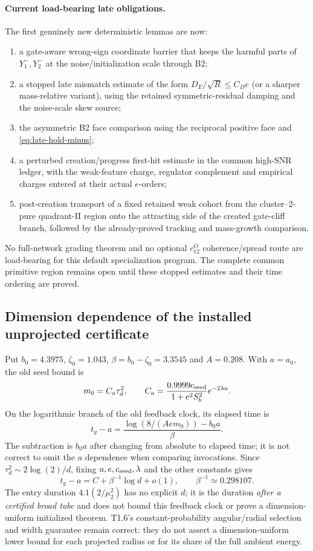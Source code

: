 \documentclass{article} %
\theoremstyle{plain}
\theoremstyle{definition}
\theoremstyle{remark}
\begin{document}
\paragraph{Current load-bearing late obligations.}
The first genuinely new deterministic lemmas are now:
\begin{enumerate}[label=\textnormal{(\roman*)}]
\item a gate-aware wrong-sign coordinate barrier that keeps the harmful parts
of $Y_1^-,Y_2^-$ at the noise/initialization scale through B2;
\item a stopped late mismatch estimate of the form $D_E/\sqrt R\le C_De$ (or
a sharper mass-relative variant), using the retained symmetric-residual
damping and the noise-scale skew source;
\item the asymmetric B2 face comparison using the reciprocal positive face and
\eqref{eq:late-hold-minus};
\item a perturbed creation/progress first-hit estimate in the common high-SNR
ledger, with the weak-feature charge, regulator complement and empirical
charges entered at their actual $e$-orders;
\item post-creation transport of a fixed retained weak cohort from the
cluster--2-pure quadrant-II region onto the attracting side of the created
gate-cliff branch, followed by the already-proved tracking and mass-growth
comparison.
\end{enumerate}
No full-network grading theorem and no optional $c_{12}^O$ coherence/spread
route are load-bearing for this default specialization program.  The complete
common primitive region remains open until these stopped estimates and their
time ordering are proved.

\subsection{Dimension dependence of the installed unprojected certificate}

Put $b_0=4.3975$, $\zeta_0=1.043$, $\beta=b_0-\zeta_0=3.3545$ and
$A=0.208$. With $a=a_0$, the old seed bound is
\[
 m_0=C_a\tau_d^2,\qquad
 C_a=\frac{0.9999c_{\rm seed}}{1+e^2S_b^2}e^{-2\lambda a}.
\]
On the logarithmic branch of the old feedback clock, its elapsed time is
\begin{equation}\label{sbguard:old-time}
 t_g-a=\frac{\log(8/(Ae m_0))-b_0a}{\beta}.
\end{equation}
The subtraction is $b_0a$ after changing from absolute to elapsed time;
it is not correct to omit the $a$ dependence when comparing invocations.
Since $\tau_d^2\sim2\log(2)/d$, fixing $a,e,c_{\rm seed},\lambda$
and the other constants gives
\[
 t_g-a=C+\beta^{-1}\log d+o(1),\qquad \beta^{-1}\simeq0.298107.
\]
The entry duration $4.1(2/\mu_2^2)$ has no explicit $d$; it is the duration
\emph{after a certified broad tube} and does not bound this feedback
clock or prove a dimension-uniform initialized theorem. T1.6's
constant-probability angular/radial selection and width guarantee remain
correct: they do not assert a dimension-uniform lower bound for each
projected radius or for its share of the full ambient energy.
\end{document}
